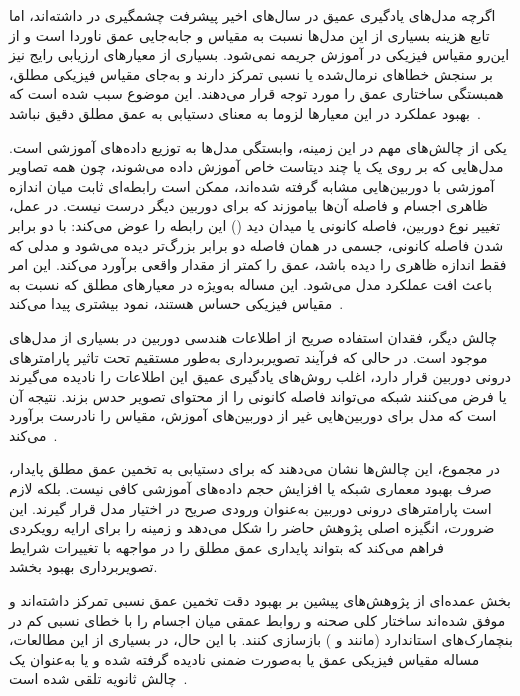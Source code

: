 
اگرچه مدل‌های یادگیری عمیق در سال‌های اخیر پیشرفت چشمگیری در  داشته‌اند،
اما تابع هزینه بسیاری از این مدل‌ها نسبت به مقیاس و جابه‌جایی عمق ناوردا است و از این‌رو مقیاس فیزیکی در آموزش جریمه نمی‌شود. بسیاری از معیارهای ارزیابی رایج نیز بر سنجش خطاهای نرمال‌شده یا نسبی تمرکز دارند
و به‌جای مقیاس فیزیکی مطلق، همبستگی ساختاری عمق را مورد توجه قرار می‌دهند. این موضوع سبب شده است که بهبود عملکرد در این معیارها لزوما به معنای دستیابی به عمق مطلق دقیق نباشد~\cite{Eigen2014Depth,Ranftl2019Robust,Ranftl2021DPT}.

یکی از چالش‌های مهم در این زمینه، وابستگی مدل‌ها به توزیع داده‌های آموزشی است. مدل‌هایی که بر روی یک یا چند دیتاست خاص آموزش داده می‌شوند، چون همه تصاویر آموزشی با دوربین‌هایی مشابه گرفته شده‌اند، ممکن است رابطه‌ای ثابت میان اندازه ظاهری اجسام و فاصله آن‌ها بیاموزند که برای دوربین دیگر درست نیست. در عمل، تغییر نوع دوربین، فاصله کانونی یا میدان دید () این رابطه را عوض می‌کند: با دو برابر شدن فاصله کانونی، جسمی در همان فاصله دو برابر بزرگ‌تر دیده می‌شود و مدلی که فقط اندازه ظاهری را دیده باشد، عمق را کمتر از مقدار واقعی برآورد می‌کند.
این امر باعث افت عملکرد مدل می‌شود. این مساله به‌ویژه در معیارهای مطلق که نسبت به مقیاس فیزیکی حساس هستند، نمود بیشتری پیدا می‌کند~\cite{Facil2019CAMConvs,Yin2023Metric3D}.

چالش دیگر، فقدان استفاده صریح از اطلاعات هندسی دوربین در بسیاری از مدل‌های موجود است. در حالی که فرآیند تصویربرداری به‌طور مستقیم تحت تاثیر پارامترهای درونی دوربین قرار دارد، اغلب روش‌های یادگیری عمیق این اطلاعات را نادیده می‌گیرند یا فرض می‌کنند شبکه می‌تواند فاصله کانونی را از محتوای تصویر حدس بزند. نتیجه آن است که مدل برای دوربین‌هایی غیر از دوربین‌های آموزش، مقیاس را نادرست برآورد می‌کند~\cite{Facil2019CAMConvs,Yin2023Metric3D}.

در مجموع، این چالش‌ها نشان می‌دهند که برای دستیابی به تخمین عمق مطلق پایدار، صرف بهبود معماری شبکه یا افزایش حجم داده‌های آموزشی کافی نیست. بلکه لازم است پارامترهای درونی دوربین به‌عنوان ورودی صریح در اختیار مدل قرار گیرند. این ضرورت، انگیزه اصلی پژوهش حاضر را شکل می‌دهد و زمینه را برای ارایه رویکردی فراهم می‌کند که بتواند پایداری عمق مطلق را در مواجهه با تغییرات شرایط تصویربرداری بهبود بخشد.


بخش عمده‌ای از پژوهش‌های پیشین بر بهبود دقت تخمین عمق نسبی تمرکز داشته‌اند و موفق شده‌اند ساختار کلی صحنه و روابط عمقی میان اجسام را با خطای نسبی کم در بنچمارک‌های استاندارد (مانند  و ) بازسازی کنند. با این حال، در بسیاری از این مطالعات، مساله مقیاس فیزیکی عمق یا به‌صورت ضمنی نادیده گرفته شده و یا به‌عنوان یک چالش ثانویه تلقی شده است~\cite{Eigen2014Depth,Godard2017Unsupervised}.


